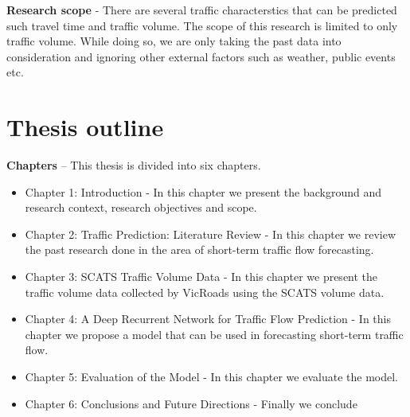 \textbf{Research scope} - There are several traffic characterstics that can be predicted such travel time and traffic volume. The scope of this research is limited to only traffic volume. While doing so, we are only taking the past data into consideration and ignoring other external factors such as weather, public events etc.


\section{Thesis outline}

\textbf{Chapters} -- This thesis is divided into six chapters.

\begin{itemize}
\item Chapter 1: Introduction - In this chapter we present the background and research context,
research objectives and scope.

\item Chapter 2: Traffic Prediction: Literature Review - In this chapter we review
the past research done in the area of short-term traffic flow forecasting.

\item Chapter 3: SCATS Traffic Volume Data - In this chapter we present the traffic volume data
collected by VicRoads using the SCATS volume data.

\item Chapter 4: A Deep Recurrent Network for Traffic Flow Prediction - In this chapter we propose a model that can be used in forecasting short-term traffic flow.

\item Chapter 5: Evaluation of the Model - In this chapter we evaluate the model.

\item Chapter 6: Conclusions and Future Directions - Finally we conclude
\end{itemize}
